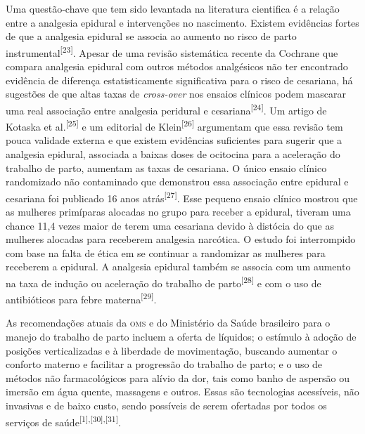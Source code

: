 \documentclass{article}
\begin{document}
Uma questão-chave que tem sido levantada na literatura cientifica é a relação
entre a
analgesia epidural e intervenções no nascimento. Existem evidências fortes de
que a
analgesia epidural se associa ao aumento no risco de parto instrumental\textsuperscript{[}\textsuperscript{23}\textsuperscript{]}. Apesar de uma revisão
sistemática recente da Cochrane que compara analgesia epidural com outros
métodos
analgésicos não ter encontrado evidência de diferença estatisticamente
significativa
para o risco de cesariana, há sugestões de que altas taxas de
\textit{cross-over}
nos ensaios clínicos podem mascarar uma real
associação entre analgesia peridural e cesariana\textsuperscript{[}\textsuperscript{24}\textsuperscript{]}. Um artigo de Kotaska et al.\textsuperscript{[}\textsuperscript{25}\textsuperscript{]}
e um editorial de Klein\textsuperscript{[}\textsuperscript{26}\textsuperscript{]}
argumentam que essa revisão tem pouca validade
externa e que existem evidências suficientes para sugerir que a analgesia
epidural,
associada a baixas doses de ocitocina para a aceleração do trabalho de parto,
aumentam as taxas de cesariana. O único ensaio clínico randomizado não
contaminado
que demonstrou essa associação entre epidural e cesariana foi publicado 16 anos
atrás\textsuperscript{[}\textsuperscript{27}\textsuperscript{]}. Esse pequeno ensaio
clínico mostrou que as mulheres primíparas alocadas no grupo para receber a
epidural, tiveram uma chance 11,4 vezes maior de terem uma cesariana devido à
distócia do que as mulheres alocadas para receberem analgesia narcótica. O
estudo
foi interrompido com base na falta de ética em se continuar a randomizar as
mulheres
para receberem a epidural. A analgesia epidural também se associa com um aumento
na
taxa de indução ou aceleração do trabalho de parto\textsuperscript{[}\textsuperscript{28}\textsuperscript{]}
e com o uso de antibióticos para febre materna\textsuperscript{[}\textsuperscript{29}\textsuperscript{]}.

As recomendações atuais da \textsc{oms} e do Ministério da Saúde brasileiro para o manejo
do
trabalho de parto incluem a oferta de líquidos; o estímulo à adoção de posições
verticalizadas e à liberdade de movimentação, buscando aumentar o conforto
materno e
facilitar a progressão do trabalho de parto; e o uso de métodos não
farmacológicos
para alívio da dor, tais como banho de aspersão ou imersão em água quente,
massagens
e outros. Essas são tecnologias acessíveis, não invasivas e de baixo custo,
sendo
possíveis de serem ofertadas por todos os serviços de saúde\textsuperscript{[}\textsuperscript{1}\textsuperscript{]}\textsuperscript{,}\textsuperscript{[}\textsuperscript{30}\textsuperscript{]}\textsuperscript{,}\textsuperscript{[}\textsuperscript{31}\textsuperscript{]}.
\end{document}
